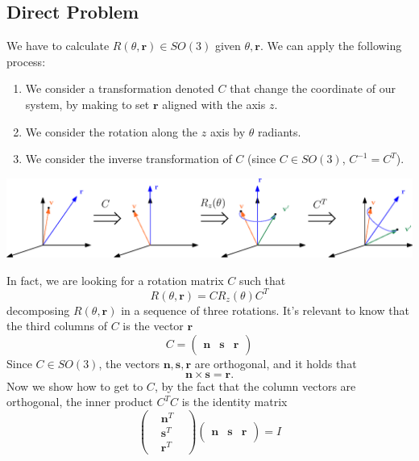 \documentclass[10pt, letterpaper]{report}
\begin{document}
\subsection{Direct Problem}
We have to calculate $R(\theta,\mathbf r)\in SO(3)$ given $\theta,\mathbf r$. We can apply the following process:\begin{enumerate}
    \item We consider a transformation denoted $C$ that change the coordinate of our system, by making to set $\mathbf r$ aligned with the axis $z$.
    \item We consider the rotation along the $z$ axis by $\theta$ radiants. 
    \item We consider the inverse transformation of $C$ (since $C\in SO(3)$, $C^{-1}=C^T$).
\end{enumerate}
\begin{center}
    \includegraphics[width=\textwidth ]{images/CRC.eps}
\end{center}
In fact, we are looking for a rotation matrix $C$ such that\begin{equation}
    R(\theta,\mathbf r)=CR_z(\theta)C^T
\end{equation}
decomposing $ R(\theta,\mathbf r)$ in a sequence of three rotations. It's relevant to know that the third columns of $C$ is the vector $\mathbf r$\begin{equation}
    C=\begin{pmatrix}
        &&\\
        \mathbf n&\mathbf s&\mathbf r\\
        &&
    \end{pmatrix}
\end{equation}
Since $C\in SO(3)$, the vectors $ \mathbf n,\mathbf s,\mathbf r$ are orthogonal, and it holds that\begin{equation}
    \mathbf n\times \mathbf s =\mathbf r.
\end{equation}
Now we show how to get to $C$, by the fact that the column vectors are orthogonal, the inner product $C^TC$ is the identity matrix\begin{equation}
    \begin{pmatrix}
        
        &\mathbf n^T&\\ &\mathbf s^T& \\&\mathbf r^T&
        
    \end{pmatrix}
    \begin{pmatrix}
        &&\\
        \mathbf n&\mathbf s&\mathbf r\\
        &&
    \end{pmatrix}=I
\end{equation}
\end{document}
